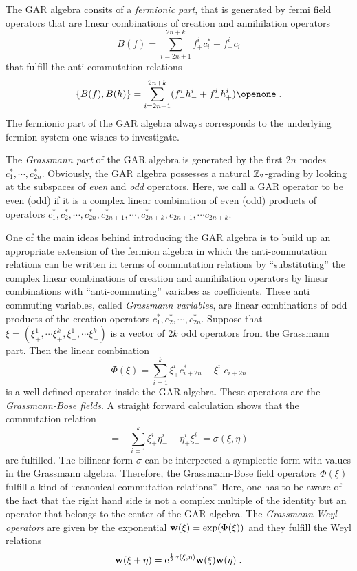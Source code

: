 \documentclass[pra,twoside,amsmath,amsfonts,amssymb,superscriptaddress,showpacs]{revtex4}
\def\1#1{{\bf #1}}
\def\7#1{{\Bbb #1}}
\def\8#1{{\rm #1}}
\def\I{\openone}
\newcommand{\CO}[2]{[#1,#2]}
\newcommand{\ACO}[2]{\{#1,#2\}}
\begin{document}
The GAR algebra consits of a {\em fermionic part}, that is generated by fermi field operators that
are linear combinations of creation and annihilation operators 
\begin{equation}
\label{eq:self-dual-fermi-fields}
B(f)=\sum_{i=2n+1}^{2n+k} f_+^i c_i^*+ f_-^i c_i 
\end{equation}
that fulfill the anti-commutation relations
\begin{equation}
\ACO{B(f)}{B(h)}=\sum_{i=2n+1}^{2n+k} (f^i_+h^i_-+ f^i_-h^i_+)\I \; .
\end{equation}
The fermionic part of the GAR algebra always corresponds to the underlying fermion system one
wishes to investigate. 

The {\em Grassmann part} of the GAR algebra is generated by the first $2n$ modes
$c_1^*,\cdots,c_{2n}^*$. Obviously, the GAR algebra possesses a natural $\7Z_2$-grading by looking
at the subspaces of {\em even} and {\em odd} operators. Here, we call a GAR operator to be even
(odd)
if it is a complex linear combination of even (odd) products of operators
$c_1^*,c_2^*,\cdots,c_{2n}^*,c_{2n+1}^*,\cdots , c_{2n+k}^*, c_{2n+1},\cdots c_{2n+k}$.

One of the main ideas behind introducing the GAR algebra is to build up an appropriate extension of
the fermion algebra in which the anti-commutation relations can be written in terms of
commutation relations by ``substituting'' the complex linear combinations of creation and
annihilation operators by linear combinations with ``anti-commuting'' variabes as coefficients.
These anti commuting variables, called {\em
Grassmann variables}, are linear
combinations of odd products of the creation operators $c_1^*,c_2^*,\cdots,c_{2n}^*$.
Suppose that $\xi=(\xi^1_+,\cdots\xi^k_+,\xi^1_-,\cdots\xi^k_-)$ is a vector of $2k$ odd
operators from the Grassmann part.
Then the linear combination 
\begin{equation}
\Phi(\xi)=\sum_{i=1}^{k} \xi_+^i c_{i+2n}^*+ \xi_-^i c_{i+2n} 
\end{equation}
is a well-defined operator inside the GAR algebra. These operators are the {\em Grassmann-Bose
fields}. A straight forward calculation shows that the commutation relation
\begin{equation}
\CO{\Phi(\xi)}{\Phi(\eta)}=-\sum_{i=1}^{k} \xi^i_+\eta^i_--\eta^i_+\xi^i_-=\sigma(\xi,\eta)
\end{equation}
are fulfilled. The bilinear form $\sigma$ can be interpreted a symplectic form with values in the
Grassmann algebra. Therefore, the Grassmann-Bose field operators $\Phi(\xi)$ fulfill a
kind of ``canonical commutation relations''. Here, one has to be aware of the fact
that the right hand side is not a complex multiple of the identity but an operator that belongs to
the
center of the GAR algebra. The {\em Grassmann-Weyl operators} are given by the
exponential
$\1w(\xi)=\exp(\Phi(\xi))$ and they fulfill the Weyl relations 
\begin{equation}
\1w(\xi+\eta)=\8e^{\frac{1}{2}\sigma(\xi,\eta)}\1w(\xi)\1w(\eta) \; .
\end{equation}
\end{document}
